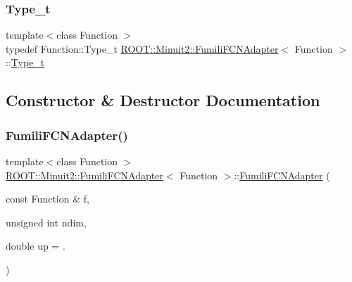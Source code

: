 \mbox{\label{classROOT_1_1Minuit2_1_1FumiliFCNAdapter_afce33892c378fb82c3209eda03824e11}} 
\subsubsection{\texorpdfstring{Type\_t}{Type\_t}\hspace{0.1cm}{\footnotesize\ttfamily [2/2]}}
{\footnotesize\ttfamily template$<$class Function $>$ \\
typedef Function\+::\+Type\+\_\+t \mbox{\hyperlink{classROOT_1_1Minuit2_1_1FumiliFCNAdapter}{R\+O\+O\+T\+::\+Minuit2\+::\+Fumili\+F\+C\+N\+Adapter}}$<$ Function $>$\+::\mbox{\hyperlink{classROOT_1_1Minuit2_1_1FumiliFCNAdapter_afce33892c378fb82c3209eda03824e11}{Type\+\_\+t}}}



\subsection{Constructor \& Destructor Documentation}
\mbox{\label{classROOT_1_1Minuit2_1_1FumiliFCNAdapter_a86273eee185e8728ef9bfa5c89bdd621}} 
\subsubsection{\texorpdfstring{FumiliFCNAdapter()}{FumiliFCNAdapter()}\hspace{0.1cm}{\footnotesize\ttfamily [1/2]}}
{\footnotesize\ttfamily template$<$class Function $>$ \\
\mbox{\hyperlink{classROOT_1_1Minuit2_1_1FumiliFCNAdapter}{R\+O\+O\+T\+::\+Minuit2\+::\+Fumili\+F\+C\+N\+Adapter}}$<$ Function $>$\+::\mbox{\hyperlink{classROOT_1_1Minuit2_1_1FumiliFCNAdapter}{Fumili\+F\+C\+N\+Adapter}} (\begin{DoxyParamCaption}\item[{const Function \&}]{f,  }\item[{unsigned int}]{ndim,  }\item[{double}]{up = {.} }\end{DoxyParamCaption})\hspace{0.3cm}{\ttfamily [inline]}}


